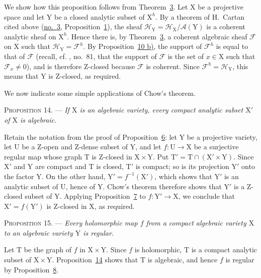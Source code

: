 We show how this proposition follows from Theorem~\hyperref[gaga:thm:3]{3}.
Let $\mathrm{X}$ be a projective space and let $\mathrm{Y}$ be a closed analytic subset of
$\mathrm{X}^h$. By a theorem of H.~Cartan cited above
(\hyperref[gaga:no:3]{no.~3}, Proposition~\hyperref[gaga:prop:1]{1}), the sheaf
$\mathcal{H}_\mathrm{Y}=\mathcal{H}_\mathrm{X}/\mathcal{A}(\mathrm{Y})$ is a coherent analytic sheaf on
$\mathrm{X}^h$. Hence there is, by Theorem~\hyperref[gaga:thm:3]{3}, a coherent
algebraic sheaf $\mathcal{F}$ on $\mathrm{X}$ such that
$\mathcal{H}_\mathrm{Y}=\mathcal{F}^h$. By Proposition~\hyperref[gaga:prop:10:item:b]{10
b)}, the support of $\mathcal{F}^h$ is equal to that of $\mathcal{F}$ (recall,
cf. , no.~81, that the support of $\mathcal{F}$ is the set of $x\in \mathrm{X}$
such that $\mathcal{F}_x\ne0$), and is therefore Z-closed because
$\mathcal{F}$ is coherent. Since $\mathcal{F}^h=\mathcal{H}_\mathrm{Y}$, this means that
$\mathrm{Y}$ is Z-closed, as required.

We now indicate some simple applications of Chow's theorem.

\textsc{Proposition 14}. --- \emph{If $\mathrm{X}$ is an
algebraic variety, every compact analytic subset $\mathrm{X}'$ of $\mathrm{X}$ is algebraic.}

Retain the notation from the proof of Proposition~\hyperref[gaga:prop:6]{6}:
let $\mathrm{Y}$ be a projective variety, let $\mathrm{U}$ be a Z-open and Z-dense subset of
$\mathrm{Y}$, and let $f:\mathrm{U}\to \mathrm{X}$ be a surjective regular map whose graph $\mathrm{T}$ is
Z-closed in $\mathrm{X}\times \mathrm{Y}$. Put $\mathrm{T}'=\mathrm{T}\cap(\mathrm{X}'\times \mathrm{Y})$. Since $\mathrm{X}'$ and $\mathrm{Y}$ are
compact and $\mathrm{T}$ is closed, $\mathrm{T}'$ is compact; so is its projection $\mathrm{Y}'$ onto
the factor $\mathrm{Y}$. On the other hand, $\mathrm{Y}'=f^{-1}(\mathrm{X}')$, which shows that $\mathrm{Y}'$ is
an analytic subset of $\mathrm{U}$, hence of $\mathrm{Y}$. Chow's theorem therefore shows that
$\mathrm{Y}'$ is a Z-closed subset of $\mathrm{Y}$. Applying
Proposition~\hyperref[gaga:prop:7]{7} to $f:\mathrm{Y}'\to \mathrm{X}$, we conclude that
$\mathrm{X}'=f(\mathrm{Y}')$ is Z-closed in $\mathrm{X}$, as required.

\textsc{Proposition 15}. --- \emph{Every holomorphic
map $f$ from a compact algebraic variety $\mathrm{X}$ to an algebraic variety $\mathrm{Y}$ is
regular.}

Let $\mathrm{T}$ be the graph of $f$ in $\mathrm{X}\times \mathrm{Y}$. Since $f$ is holomorphic, $\mathrm{T}$ is
a compact analytic subset of $\mathrm{X}\times \mathrm{Y}$. Proposition~\hyperref[gaga:prop:14]{14}
shows that $\mathrm{T}$ is algebraic, and hence $f$ is regular by
Proposition~\hyperref[gaga:prop:8]{8}.

